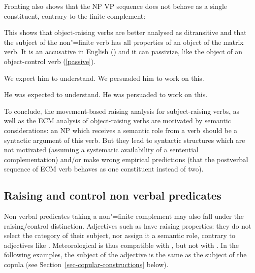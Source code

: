\documentclass[output=paper
	        ,collection
	        ,collectionchapter
 	        ,biblatex
                ,babelshorthands
                ,newtxmath
                ,draftmode
                ,colorlinks, citecolor=brown
]{./langsci/langscibook}
\begin{document}
Fronting also shows that the NP VP sequence does not behave as a single constituent, contrary to the finite complement:

\eal
{}
\zl


This shows that object-raising verbs are better analysed as ditransitive and that the subject of the non"=finite verb has all properties of an object of the matrix verb. It is an accusative in English () and it can passivize, like the object of an object-control verb (\ref{passive}).

\begin{exe}
\ex
\begin{xlist}
\ex We expect him to understand.
\ex  We persuaded him to work on this.
\end{xlist}
\ex \begin{xlist} \label{passive}
\ex  He was expected to understand.
\ex  He was persuaded to work on this.
\end{xlist}
	
\end{exe}


To conclude, the movement-based raising analysis for subject-raising verbs, as well as the ECM analysis of object-raising verbs are motivated by semantic considerations: an NP which receives a semantic role from a verb should be a syntactic argument of this verb. But they lead to syntactic structures which are not motivated (assuming a systematic availability of a sentential complementation) and/or make wrong empirical predictions (that the postverbal sequence of ECM verb behaves as one constituent instead of two).
 
\subsection{Raising and control non verbal predicates}\label{nonverbal}

Non verbal predicates taking a non"=finite complement may also fall under the raising/control distinction.  Adjectives such as  have raising properties: they do not select the category of their subject, nor assign it a semantic role, contrary to adjectives like . Meteorological  is thus compatible with , but not with . In the following examples, the subject of the adjective is the same as the subject of the copula (see Section~\ref{sec-copular-constructions} below).
\end{document}
